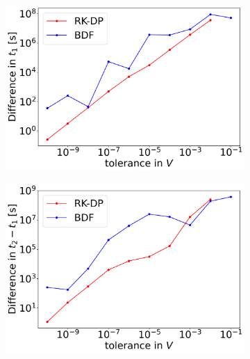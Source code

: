 \begin{figure}[H]
	\centering
	\begin{subfigure}[t]{0.32\textwidth}
		\centering
		\includegraphics[width=1\textwidth]{images/TANDEMextendedODEDifferentTolerancesSize101_AS_FirstEarthquakeTimeDiff.png}
	\end{subfigure} 
	\begin{subfigure}[t]{0.32\textwidth}
		\centering
		\includegraphics[width=1\textwidth]{images/TANDEMextendedODEDifferentTolerancesSize101_AS_PeriodDiff.png}
	\end{subfigure}
	\begin{subfigure}[t]{0.32\textwidth}
		\centering

\end{subfigure}
\end{figure}
